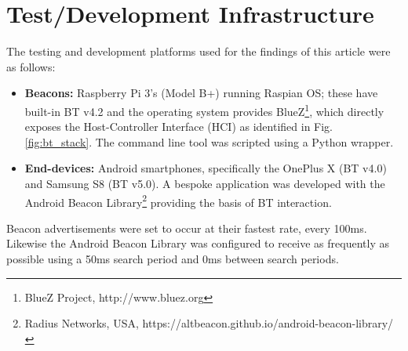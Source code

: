 \documentclass[conference]{IEEEtran} %
\begin{document}
\section{Test/Development Infrastructure}
The testing and development platforms used for the findings of this article were as follows:
\begin{itemize}
	\item \textbf{Beacons:} Raspberry Pi 3's (Model B+) running Raspian OS; these have built-in BT v4.2 and the operating system provides BlueZ\footnote{BlueZ Project, http://www.bluez.org}, which directly exposes the Host-Controller Interface (HCI) as identified in Fig. \ref{fig:bt_stack}. The command line tool was scripted using a Python wrapper.
	\item \textbf{End-devices:} Android smartphones, specifically the OnePlus X (BT v4.0) and Samsung S8 (BT v5.0). A bespoke application was developed with the Android Beacon Library\footnote{Radius Networks, USA, https://altbeacon.github.io/android-beacon-library/} providing the basis of BT interaction.
\end{itemize}

Beacon advertisements were set to occur at their fastest rate, every 100ms. 
Likewise the Android Beacon Library was configured to receive as frequently as possible using a 50ms search period and 0ms between search periods.
\end{document}
